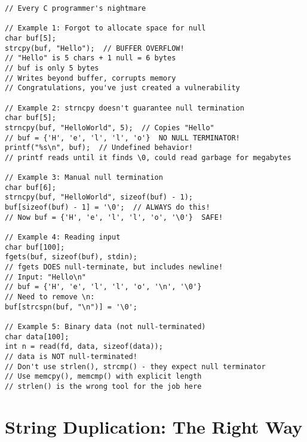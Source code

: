 \begin{lstlisting}
// Every C programmer's nightmare

// Example 1: Forgot to allocate space for null
char buf[5];
strcpy(buf, "Hello");  // BUFFER OVERFLOW!
// "Hello" is 5 chars + 1 null = 6 bytes
// buf is only 5 bytes
// Writes beyond buffer, corrupts memory
// Congratulations, you've just created a vulnerability

// Example 2: strncpy doesn't guarantee null termination
char buf[5];
strncpy(buf, "HelloWorld", 5);  // Copies "Hello"
// buf = {'H', 'e', 'l', 'l', 'o'}  NO NULL TERMINATOR!
printf("%s\n", buf);  // Undefined behavior!
// printf reads until it finds \0, could read garbage for megabytes

// Example 3: Manual null termination
char buf[6];
strncpy(buf, "HelloWorld", sizeof(buf) - 1);
buf[sizeof(buf) - 1] = '\0';  // ALWAYS do this!
// Now buf = {'H', 'e', 'l', 'l', 'o', '\0'}  SAFE!

// Example 4: Reading input
char buf[100];
fgets(buf, sizeof(buf), stdin);
// fgets DOES null-terminate, but includes newline!
// Input: "Hello\n"
// buf = {'H', 'e', 'l', 'l', 'o', '\n', '\0'}
// Need to remove \n:
buf[strcspn(buf, "\n")] = '\0';

// Example 5: Binary data (not null-terminated)
char data[100];
int n = read(fd, data, sizeof(data));
// data is NOT null-terminated!
// Don't use strlen(), strcmp() - they expect null terminator
// Use memcpy(), memcmp() with explicit length
// strlen() is the wrong tool for the job here
\end{lstlisting}

\section{String Duplication: The Right Way}

